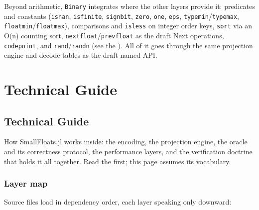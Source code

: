 \label{15708086746009923714}{}


Beyond arithmetic, \texttt{Binary} integrates where the other layers provide it: predicates and constants (\texttt{isnan}, \texttt{isfinite}, \texttt{signbit}, \texttt{zero}, \texttt{one}, \texttt{eps}, \texttt{typemin}/\texttt{typemax}, \texttt{floatmin}/\texttt{floatmax}), comparisons and \texttt{isless} on integer order keys, \texttt{sort} via an O(n) counting sort, \texttt{nextfloat}/\texttt{prevfloat} as the draft Next operations, \texttt{codepoint}, and \texttt{rand}/\texttt{randn} (see the ). All of it goes through the same projection engine and decode tables as the draft-named API.



\part{Technical Guide}


\chapter{Technical Guide}



\label{4463396622184713734}{}


How SmallFloats.jl works inside: the encoding, the projection engine, the oracle and its correctness protocol, the performance layers, and the verification doctrine that holds it all together. Read the  first; this page assumes its vocabulary.



\section{Layer map}



\label{9668567837796074949}{}


Source files load in dependency order, each layer speaking only downward:




